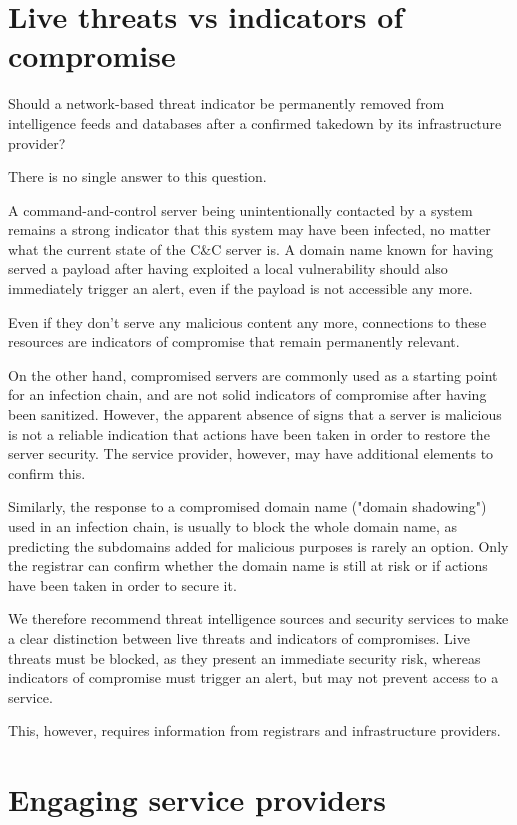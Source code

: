 \documentclass[conference]{IEEEtran}
\begin{document}
\section{Live threats vs indicators of compromise}

Should a network-based threat indicator be permanently removed from intelligence feeds and databases after a confirmed takedown by its infrastructure provider?

There is no single answer to this question.

A command-and-control server being unintentionally contacted by a system remains a strong indicator that this system may have been infected, no matter what the current state of the C\&C server is.
A domain name known for having served a payload after having exploited a local vulnerability should also immediately trigger an alert, even if the payload is not accessible any more.

Even if they don't serve any malicious content any more, connections to these resources are indicators of compromise that remain permanently relevant.

On the other hand, compromised servers are commonly used as a starting point for an infection chain, and are not solid indicators of compromise after having been sanitized. However, the apparent absence of signs that a server is malicious is not a reliable indication that actions have been taken in order to restore the server security. The service provider, however, may have additional elements to confirm this.

Similarly, the response to a compromised domain name ("domain shadowing") used in an infection chain, is usually to block the whole domain name, as predicting the subdomains added for malicious purposes is rarely an option. Only the registrar can confirm whether the domain name is still at risk or if actions have been taken in order to secure it.

We therefore recommend threat intelligence sources and security services to make a clear distinction between live threats and indicators of compromises. Live threats must be blocked, as they present an immediate security risk, whereas indicators of compromise must trigger an alert, but may not prevent access to a service.

This, however, requires information from registrars and infrastructure providers.

\section{Engaging service providers}
\end{document}
